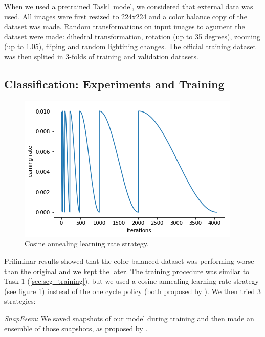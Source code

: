  When we used a pretrained Task1 model, we considered that external data was used. All images were first resized to 224x224 and a color balance copy of the dataset was made. Random transformations on input images to agument the dataset were made: dihedral transformation, rotation (up to 35 degrees), zooming (up to 1.05), fliping and random lightining changes. The official training dataset was then splited in 3-folds of training and validation datasets.  


\subsection{Classification: Experiments and Training}
\begin{figure}[htbp]
\centerline{\includegraphics[width=.8\columnwidth]{cycle.png}}
\caption{Cosine annealing learning rate strategy. \label{cosine}}
\end{figure}


Priliminar results showed that the color balanced dataset was performing worse than the original and we kept the later. The training procedure was similar to Task 1 (\ref{sec:seg_training}), but we used a cosine annealing learning rate strategy (see figure \ref{cosine}) instead of the one cycle policy (both proposed by \cite{leslie}). We then tried 3 strategies:

\emph{SnapEsem}: We saved snapshots of our model during training and then made an ensemble of those snapshots, as proposed by \cite{snapshots}.

